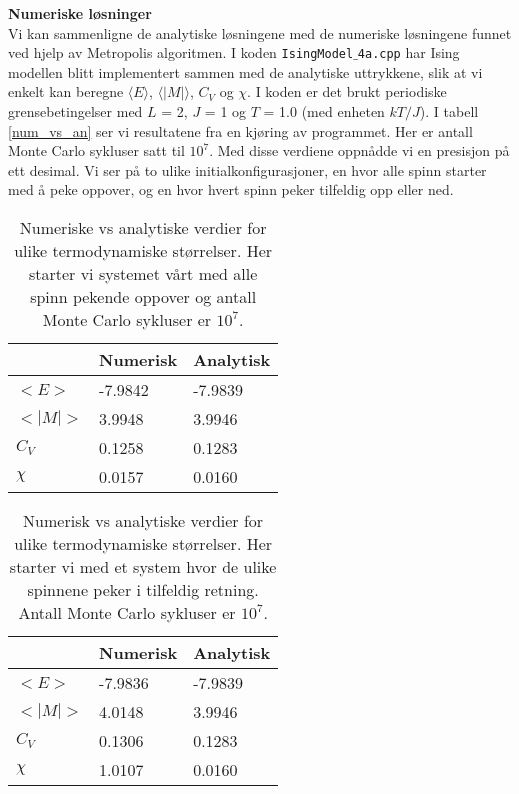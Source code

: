 \documentclass[11pt,a4paper]{article}
\begin{document}
\textbf{Numeriske løsninger}\\
Vi kan sammenligne de analytiske løsningene med de numeriske løsningene funnet ved hjelp av Metropolis algoritmen. I koden \texttt{IsingModel$\_$4a.cpp} har Ising modellen blitt implementert sammen med de analytiske uttrykkene, slik at vi enkelt kan beregne $\langle E \rangle$, $\langle |M| \rangle$, $C_V$ og $\chi$. I koden er det brukt periodiske grensebetingelser med $L$ = 2, $J$ = 1 og $T$ = 1.0 (med enheten $kT/J$). I tabell \ref{num_vs_an} ser vi resultatene fra en kjøring av programmet. Her er antall Monte Carlo sykluser satt til $10^7$. Med disse verdiene oppnådde vi en presisjon på ett desimal. Vi ser på to ulike initialkonfigurasjoner, en hvor alle spinn starter med å peke oppover, og en hvor hvert spinn peker tilfeldig opp eller ned.

\FloatBarrier
\begin{table}[!ht]
\centering
\caption{Numeriske vs analytiske verdier for ulike termodynamiske størrelser. Her starter vi systemet vårt med alle spinn pekende oppover og antall Monte Carlo sykluser er $10^7$.}
\label{num_vs_an_up}
\begin{tabular}{|l|l|l|}
\hline
        & Numerisk & Analytisk \\ \hline
$<E>$   & -7.9842  & -7.9839   \\ \hline
$<|M|>$ & 3.9948   & 3.9946    \\ \hline
$C_V$   & 0.1258   & 0.1283    \\ \hline
$\chi$  & 0.0157   & 0.0160    \\ \hline
\end{tabular}
\end{table}
\FloatBarrier

\FloatBarrier
\begin{table}[!ht]
\centering
\caption{Numerisk vs analytiske verdier for ulike termodynamiske størrelser. Her starter vi med et system hvor de ulike spinnene peker i tilfeldig retning. Antall Monte Carlo sykluser er $10^7$.}
\label{num_vs_an_rand}
\begin{tabular}{|l|l|l|}
\hline
        & Numerisk & Analytisk \\ \hline
$<E>$   & -7.9836  & -7.9839   \\ \hline
$<|M|>$ & 4.0148   & 3.9946    \\ \hline
$C_V$   & 0.1306   & 0.1283    \\ \hline
$\chi$  & 1.0107   & 0.0160    \\ \hline
\end{tabular}
\end{table}
\FloatBarrier
\end{document}
